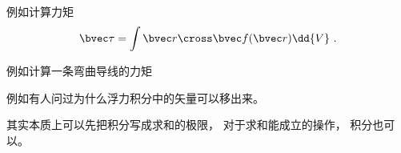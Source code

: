 
\begin{issues}
\issueDraft
\end{issues}

例如计算力矩
\begin{equation}
\bvec \tau = \int \bvec r \cross \bvec f(\bvec r) \dd{V}~.
\end{equation}

例如计算一条弯曲导线的力矩

例如有人问过为什么浮力积分中的矢量可以移出来。

其实本质上可以先把积分写成求和的极限， 对于求和能成立的操作， 积分也可以。
